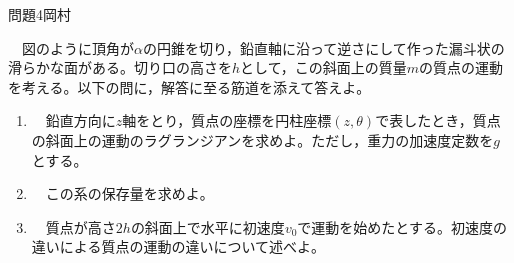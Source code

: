 \documentclass[fleqn]{jbook}
\begin{document}

\begin{question}{問題4}{岡村}
\setcounter{equation}{0}

　図のように頂角が$\alpha$の円錐を切り，鉛直軸に沿って逆さにして作った漏斗状の滑らかな面がある。切り口の高さを$h$として，この斜面上の質量$m$の質点の運動を考える。以下の問に，解答に至る筋道を添えて答えよ。\\


\begin{enumerate}


  \item 　鉛直方向に$z$軸をとり，質点の座標を円柱座標$\left(z,\theta\right)$で表したとき，質点の斜面上の運動のラグランジアンを求めよ。ただし，重力の加速度定数を$g$とする。\\
  
  \item 　この系の保存量を求めよ。\\
  
  \item 　質点が高さ$2h$の斜面上で水平に初速度$v_0$で運動を始めたとする。初速度の違いによる質点の運動の違いについて述べよ。\\

\end{enumerate}

\begin{figure}[hbtp]
\begin{center}
\vspace{1.0cm}

\end{center}
\end{figure}

\end{question}

\end{document}
